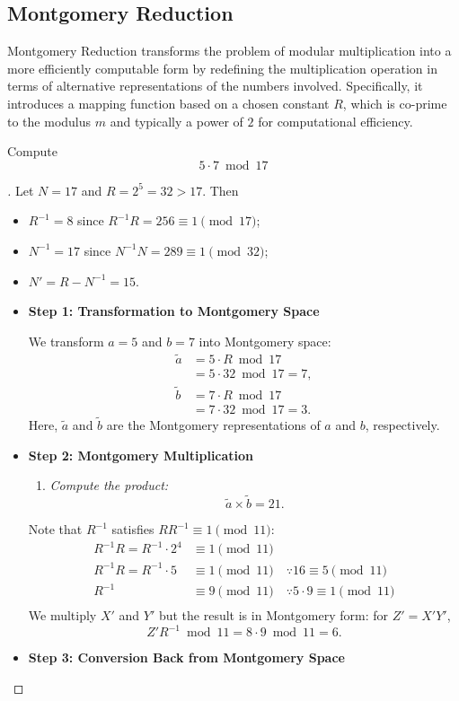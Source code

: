 \subsection{Montgomery Reduction}
Montgomery Reduction transforms the problem of modular multiplication into a more efficiently computable form by redefining the multiplication operation in terms of alternative representations of the numbers involved. Specifically, it introduces a mapping function based on a chosen constant $R$, which is co-prime to the modulus $m$ and typically a power of $2$ for computational efficiency.
\vspace{8pt}
\begin{example}
Compute \[
5\cdot 7\bmod{17}
\] \begin{proof}[\sol]
Let $N=17$ and $R=2^5=32>17$. Then \begin{itemize}
	\item $R^{-1}=8$ since $R^{-1}R=256\equiv 1\pmod{17}$;
	\item $N^{-1}=17$ since $N^{-1}N=289\equiv 1\pmod{32}$;
	\item $N'=R-N^{-1}=15$.
\end{itemize} 
\begin{itemize}
\item[] \textbf{Step 1: Transformation to Montgomery Space}

We transform $a=5$ and $b=7$ into Montgomery space: \begin{align*}
\tilde{a}&=5\cdot R\bmod 17\\
&=5\cdot32\bmod 17 = 7, \\
\tilde{b}&=7\cdot R\bmod 17\\
&=7\cdot32\bmod 17 = 3.
\end{align*} Here, $\tilde{a}$ and $\tilde{b}$ are the Montgomery representations of $a$ and $b$, respectively.
\item[] \textbf{Step 2: Montgomery Multiplication}

\begin{enumerate}
	\item \textit{Compute the product:} \[
	\tilde{a}\times\tilde{b}=21.
	\]
\end{enumerate}

Note that $R^{-1}$ satisfies $RR^{-1}\equiv 1\pmod{11}$: \begin{align*}
	R^{-1}R=R^{-1}\cdot 2^4&\equiv 1\pmod{11} \\
	R^{-1}R=R^{-1}\cdot 5&\equiv 1\pmod{11}\quad\because 16\equiv 5\pmod{11} \\
	R^{-1}&\equiv 9\pmod{11}\quad\because 5\cdot 9\equiv 1\pmod{11} \\
\end{align*} 
We multiply $X'$ and $Y'$ but the result is in Montgomery form: for $Z'=X'Y'$, \[
Z'R^{-1}\bmod 11 = 8\cdot 9\bmod 11 = 6.
\]
\item[] \textbf{Step 3: Conversion Back from Montgomery Space}
\end{itemize}
\end{proof}
\end{example}
